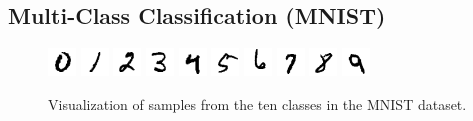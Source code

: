 \subsection{Multi-Class Classification (MNIST)}
\begin{figure}
    \includegraphics[width=.092\linewidth, frame]{evaluation/images/mnist_digit_0}
    \includegraphics[width=.092\linewidth, frame]{evaluation/images/mnist_digit_1}
    \includegraphics[width=.092\linewidth, frame]{evaluation/images/mnist_digit_2}
    \includegraphics[width=.092\linewidth, frame]{evaluation/images/mnist_digit_3}
    \includegraphics[width=.092\linewidth, frame]{evaluation/images/mnist_digit_4}
    \includegraphics[width=.092\linewidth, frame]{evaluation/images/mnist_digit_5}
    \includegraphics[width=.092\linewidth, frame]{evaluation/images/mnist_digit_6}
    \includegraphics[width=.092\linewidth, frame]{evaluation/images/mnist_digit_7}
    \includegraphics[width=.092\linewidth, frame]{evaluation/images/mnist_digit_8}
    \includegraphics[width=.092\linewidth, frame]{evaluation/images/mnist_digit_9}
    \caption{%
        Visualization of samples from the ten classes in the MNIST dataset.
    }
\end{figure}
